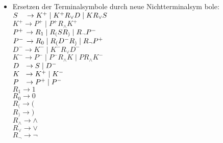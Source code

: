 \documentclass[11pt]{article}
\begin{document}
\begin{enumerate}
\begin{itemize}
\item \hspace*{6mm} Ersetzen der Terminalsymbole durch neue Nichtterminalsym \hspace*{7,5mm}bole:
\\\hspace*{6mm} $S \hspace{3,5mm}\rightarrow K^{+}\mid K^{+}R_{\vee}D\mid KR_{\vee}S$
\\\hspace*{6mm} $K^{+} \rightarrow P^{+}\mid P^{+}R_{\wedge}K^{+}$
\\\hspace*{6mm} $P^{+} \hspace{0,5mm}\rightarrow R_{1}\mid R_{(}SR_{)}\mid R_{\neg} P^{-}$
\\\hspace*{6mm} $P^{-} \hspace{0,5mm}\rightarrow R_{0}\mid R_{(}D^{-}R_{)}\mid R_{\neg}P^{+}$
\\\hspace*{6mm} $D^{-} \rightarrow K^{-}\mid K^{-}R_{\vee}D^{-}$
\\\hspace*{6mm} $K^{-} \rightarrow P^{-}\mid P^{-}R_{\wedge} K\mid PR_{\wedge} K^{-}$
\\\hspace*{6mm} $D \hspace{2,5mm}\rightarrow S\mid D^{-}$
\\\hspace*{6mm} $K \hspace{2,2mm}\rightarrow K^{+}\mid K^{-}$
\\\hspace*{6mm} $P \hspace{2,8mm}\rightarrow P^{+}\mid P^{-}$
\\\hspace*{6mm} $R_{1} \rightarrow 1$
\\\hspace*{6mm} $R_{0} \rightarrow 0$
\\\hspace*{6mm} $R_{(} \rightarrow ($
\\\hspace*{6mm} $R_{)} \rightarrow )$
\\\hspace*{6mm} $R_{\wedge} \rightarrow \wedge$
\\\hspace*{6mm} $R_{\vee} \rightarrow \vee$
\\\hspace*{6mm} $R_{\neg} \rightarrow \neg$

\end{itemize}
\end{enumerate}
\end{document}
